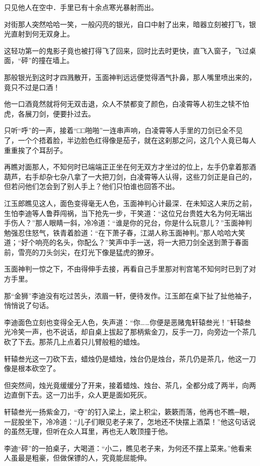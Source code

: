 \documentclass[12pt,oneside]{book}
\begin{document}
只见他人在空中．手里已有十余点寒光暴射而出。

对街那人突然哈哈一笑，一般闪亮的银光，自口中射了出来，暗器立刻被打飞，银光直射到何无双身上。

这轻功第一的鬼影子竟也被打得飞了回来，回时比去时更快，直飞入窗子，飞过桌面，``砰''的撞在墙上。

那般银光到这时才四溅散开，玉面神判远远便觉得酒气扑鼻，那人嘴里喷出来的，竟只不过是口酒！

他一口酒竟然就将何无双击退，众人不禁都变了颜色，白凌霄等人初生之犊不怕虎，各展刀剑，便要扑过去。

只听``呼''的一声，接着``□□啪啪''一连串声响，白凌霄等人手里的刀剑已全不见了，一个个捂着脸，半边脸色红得像是茄子，就在这刹那之问，这几个人竟已每人重重挨了个耳刮子。

再瞧对面那人，不知何时已端端正正坐在何无双方才坐过的位上，左手仍拿着那酒葫芦，右手却杂七杂八拿了一大把刀剑，白凌霄等人认得，这些刀剑正是自己的，但若问他们怎会到了别人手上？他们只怕谁也回答不出。

江玉郎瞧见这人，面色变得毫无人色，玉面神判心计最深．在未知这人来历之前，生怕李迪等人鲁莽闯祸，当下抢先一步，干笑道：``这位兄台贵姓大名为何无端出手伤人？''那人眼睛一斜，冷冷道：``谁是你的兄台，你是什么玩意儿？''玉面神判勉强忍住怒气，铁青着脸道：``在下萧子春，江湖人称玉面神判。''那人哈哈大笑道；``好个响亮的名头，你配么？''笑声中手一送，将一大把刀剑全送到萧于春面前，雪亮的刀头剑尖，在灯光下像是猛虎的獠牙。

玉面神判一惊之下，不由得伸手去接，再看自己手里那对判宫笔不知何时已到了对方手里。

那``金狮''李迪没有吃过苦头，浓眉一轩，便待发作。江玉郎在桌下扯了扯他袖子，悄悄说了句话。

李迪面色立刻也变得全无人色，失声道：``你\ldots\ldots 你便是恶赌鬼轩辕叁光！''轩辕叁光冷笑一声，也不说话，却自桌上拔起了那柄紫金刀，反手一刀，向旁边一个茶几砍了下去。那茶几上点着只儿臂般粗的蜡烛。

轩辕叁光这一刀砍下去，蜡烛仍是蜡烛，烛台仍是烛台，茶几仍是茶几，他这一刀像是根本砍空了。

但突然间，烛光竟缓缓分了开来，接着蜡烛、烛台、茶几，全都分成了两半，向两边直倒下去。这一刀出手，众人更是面如死灰。

轩辕叁光一扬紫金刀，``夺''的钉入梁上，梁上积尘，簌簌而落，他再也不瞧─眼，一屁股坐下，冷冷道：``儿子们眼见老子来了，怎地还不快摆上酒菜！''他这句话说的虽然无理，但听在众人耳里，再也无人敢顶撞于他。

李迪``砰''的一拍桌子，大喝道：``小二，瞧见老子来，为何还不摆上菜来。''他看来人虽最是粗豪，但做保镖的人，究竟能屈能伸。
\end{document}
